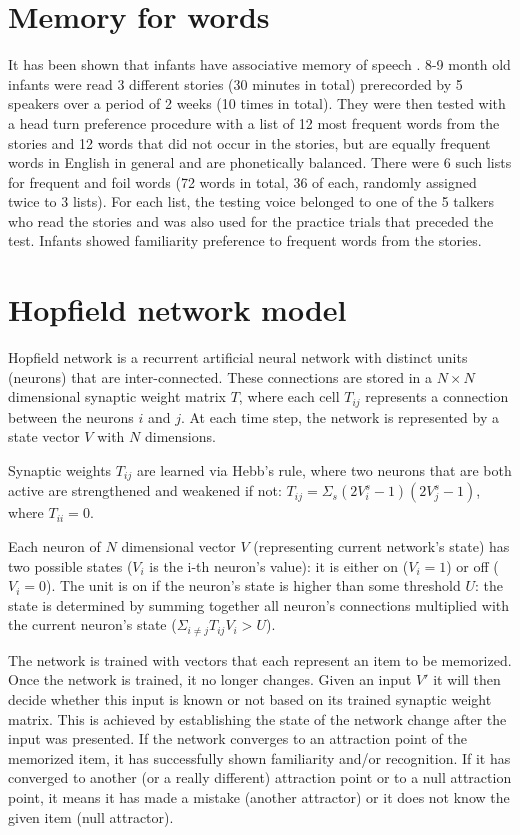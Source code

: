 \documentclass{article}
\begin{document}
\section{Memory for words}

It has been shown that infants have associative memory of speech \cite{jusczyk1997infants}. 8-9 month old infants were read 3 different stories (30 minutes in total) prerecorded by 5 speakers over a period of 2 weeks (10 times in total). They were then tested with a head turn preference procedure with a list of 12 most frequent words from the stories and 12 words that did not occur in the stories, but are equally frequent words in English in general and are phonetically balanced. There were 6 such lists for frequent and foil words (72 words in total, 36 of each, randomly assigned twice to 3 lists). For each list, the testing voice belonged to one of the 5 talkers who read the stories and was also used for the practice trials that preceded the test. Infants showed familiarity preference to frequent words from the stories.


\section{Hopfield network model}


Hopfield network \cite{hopfield1982neural} is a recurrent artificial neural network with distinct units (neurons) that are inter-connected. These connections are stored in a $N \times N$ dimensional synaptic weight matrix $T$, where each cell $T_{ij}$ represents a connection between the neurons $i$ and $j$. At each time step, the network is represented by a state vector $V$ with $N$ dimensions.

Synaptic weights $T_{ij}$ are learned via Hebb's rule, where two neurons that are both active are strengthened and weakened if not: $T_{ij} = \Sigma_s (2V_i^s-1)(2V_j^s-1)$, where $T_{ii}=0$. 

Each neuron of $N$ dimensional vector $V$ (representing current network's state) has two possible states ($V_i$ is the i-th neuron's value): it is either on ($V_i=1$) or off ($V_i=0$). The unit is on if the neuron's state is higher than some threshold $U$: the state is determined by summing together all neuron's connections multiplied with the current neuron's state ($\Sigma_{i \neq j} T_{ij} V_i > U$).

The network is trained with vectors that each represent an item to be memorized. Once the network is trained, it no longer changes. Given an input $V'$ it will then decide whether this input is known or not based on its trained synaptic weight matrix. This is achieved by establishing the state of the network change after the input was presented. If the network converges to an attraction point of the memorized item, it has successfully shown familiarity and/or recognition. If it has converged to another (or a really different) attraction point or to a null attraction point, it means it has made a mistake (another attractor) or it does not know the given item (null attractor).
\end{document}
